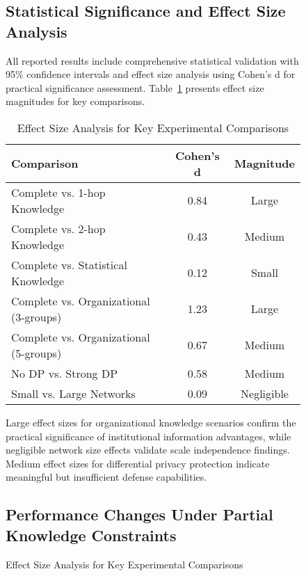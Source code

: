 \begin{figure}[!t]
\subsection{Statistical Significance and Effect Size Analysis}

All reported results include comprehensive statistical validation with 95\% confidence intervals and effect size analysis using Cohen's d for practical significance assessment. Table~\ref{tab:effect_sizes} presents effect size magnitudes for key comparisons.

\begin{table}[!t]
\caption{Effect Size Analysis for Key Experimental Comparisons}
\label{tab:effect_sizes}
\centering
\footnotesize
\begin{tabular}{@{}lcc@{}}
\toprule
\textbf{Comparison} & \textbf{Cohen's d} & \textbf{Magnitude} \\
\midrule
Complete vs. 1-hop Knowledge & 0.84 & Large \\
Complete vs. 2-hop Knowledge & 0.43 & Medium \\
Complete vs. Statistical Knowledge & 0.12 & Small \\
Complete vs. Organizational (3-groups) & 1.23 & Large \\
Complete vs. Organizational (5-groups) & 0.67 & Medium \\
\midrule
No DP vs. Strong DP & 0.58 & Medium \\
Small vs. Large Networks & 0.09 & Negligible \\
\bottomrule
\end{tabular}
\end{table}

Large effect sizes for organizational knowledge scenarios confirm the practical significance of institutional information advantages, while negligible network size effects validate scale independence findings. Medium effect sizes for differential privacy protection indicate meaningful but insufficient defense capabilities.

\subsection{Performance Changes Under Partial Knowledge Constraints}


\end{figure}

